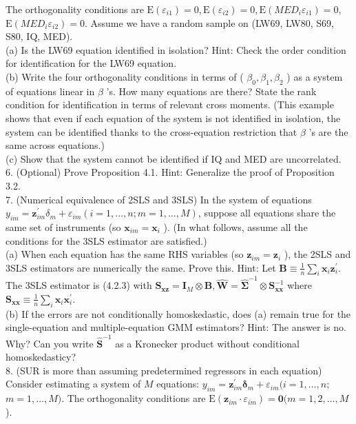 \documentclass[10pt]{article}
\begin{document}
The orthogonality conditions are $\mathrm{E}\left(\varepsilon_{i 1}\right)=0, \mathrm{E}\left(\varepsilon_{i 2}\right)=0, \mathrm{E}\left(M E D_{i} \varepsilon_{i 1}\right)=0$, $\mathrm{E}\left(M E D_{i} \varepsilon_{i 2}\right)=0$. Assume we have a random sample on (LW69, LW80, S69, S80, IQ, MED).\\
(a) Is the LW69 equation identified in isolation? Hint: Check the order condition for identification for the LW69 equation.\\
(b) Write the four orthogonality conditions in terms of ( $\beta_{0}, \beta_{1}, \beta_{2}$ ) as a system of equations linear in $\beta$ 's. How many equations are there? State the rank condition for identification in terms of relevant cross moments. (This example shows that even if each equation of the system is not identified in isolation, the system can be identified thanks to the cross-equation restriction that $\beta$ 's are the same across equations.)\\
(c) Show that the system cannot be identified if IQ and MED are uncorrelated.\\
6. (Optional) Prove Proposition 4.1. Hint: Generalize the proof of Proposition 3.2.\\
7. (Numerical equivalence of 2SLS and 3SLS) In the system of equations $y_{i m}= \mathbf{z}_{i m}^{\prime} \delta_{m}+\varepsilon_{i m}(i=1, \ldots, n ; m=1, \ldots, M)$, suppose all equations share the same set of instruments (so $\mathbf{x}_{i m}=\mathbf{x}_{i}$ ). (In what follows, assume all the conditions for the 3SLS estimator are satisfied.)\\
(a) When each equation has the same RHS variables (so $\mathbf{z}_{i m}=\mathbf{z}_{i}$ ), the 2SLS and 3SLS estimators are numerically the same. Prove this. Hint: Let $\mathbf{B} \equiv \frac{1}{n} \sum_{i} \mathbf{x}_{i} \mathbf{z}_{i}^{\prime}$. The 3SLS estimator is (4.2.3) with $\mathbf{S}_{\mathbf{x z}}=\mathbf{I}_{M} \otimes \mathbf{B}, \widehat{\mathbf{W}}=\widehat{\mathbf{\Sigma}}^{-1} \otimes \mathbf{S}_{\mathbf{x x}}^{-1}$ where $\mathbf{S}_{\mathbf{x x}} \equiv \frac{1}{n} \sum_{i} \mathbf{x}_{i} \mathbf{x}_{i}^{\prime}$.\\
(b) If the errors are not conditionally homoskedastic, does (a) remain true for the single-equation and multiple-equation GMM estimators? Hint: The answer is no. Why? Can you write $\widehat{\mathbf{S}}^{-1}$ as a Kronecker product without conditional homoskedasticy?\\
8. (SUR is more than assuming predetermined regressors in each equation) Consider estimating a system of $M$ equations: $y_{i m}=\mathbf{z}_{i m}^{\prime} \boldsymbol{\delta}_{m}+\varepsilon_{i m}(i=1, \ldots, n$; $m=1, \ldots, M)$. The orthogonality conditions are $\mathrm{E}\left(\mathbf{z}_{i m} \cdot \varepsilon_{i m}\right)=\mathbf{0}(m= 1,2, \ldots, M$ ).\\
\end{document}
